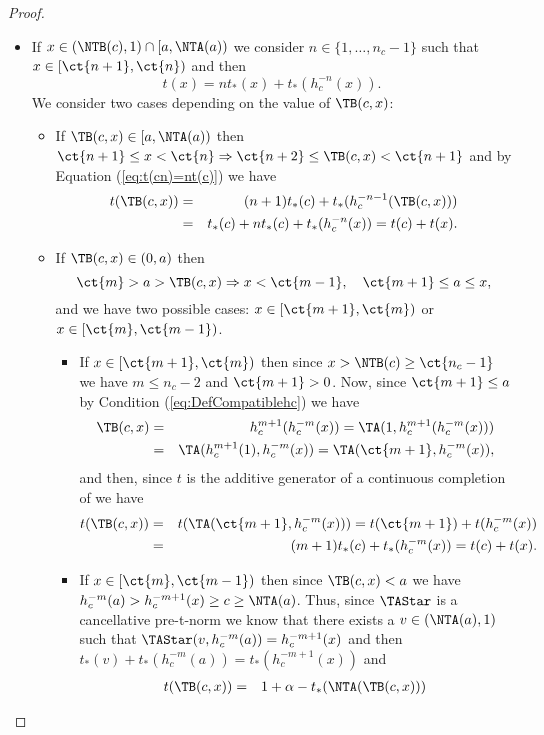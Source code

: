 \begin{proof}
\begin{enumerate}[label=(\roman*)]
\begin{itemize}
\begin{itemize}
				\item If $x \in (\NTB(c),1) \cap [a,\NTA(a))$ we consider $n \in \{1,\dots,n_c-1\}$ such that $x \in [\ct{n+1},\ct{n})$ and then
				$$ t(x) = nt_*(x)+t_*(h_c^{-n}(x)).$$
				We consider two cases depending on the value of $\TB(c,x)$:
				\begin{itemize}
					\item  If $\TB(c,x) \in [a,\NTA(a))$ then $\ct{n+1} \leq x < \ct{n} \Rightarrow \ct{n+2} \leq \TB(c,x) < \ct{n+1}$ and by Equation (\ref{eq:t(cn)=nt(c)}) we have
					\begin{eqnarray*}
					t(\TB(c,x)) & = & (n+1)t_*(c)+t_*(h_c^{-n-1}(\TB(c,x))) \\
					& = & t_*(c) + nt_*(c) + t_*(h_c^{-n}(x)) = t(c)+t(x).
					\end{eqnarray*}
					\item  If $\TB(c,x) \in (0,a)$ then
					$$\ct{m} > a > \TB(c,x) \Rightarrow x < \ct{m-1}, \quad \ct{m+1} \leq a \leq x,$$
					and we have two possible cases: $x \in [\ct{m+1},\ct{m})$ or $x \in [\ct{m},\ct{m-1})$.
					\begin{itemize}
						\item If $x \in [\ct{m+1},\ct{m})$ then since $x > \NTB(c) \geq \ct{n_c-1}$ we have $m \leq n_c-2$ and $\ct{m+1}>0$. Now, since $\ct{m+1} \leq a$ by Condition (\ref{eq:DefCompatiblehc}) we have
						\begin{eqnarray*}
							\TB(c,x) &=& h_c^{m+1}(h_c^{-m}(x)) = \TA(1,h_c^{m+1}(h_c^{-m}(x))) \\
							&=& \TA(h_c^{m+1}(1),h_c^{-m}(x))= \TA(\ct{m+1},h_c^{-m}(x)),
						\end{eqnarray*}
						and then, since $t$ is the additive generator of a continuous completion of \TA we have
						\begin{eqnarray*}
							t(\TB(c,x)) &=& t(\TA(\ct{m+1},h_c^{-m}(x))) = t(\ct{m+1}) + t(h_c^{-m}(x)) \\
							&=& (m+1)t_*(c)+ t_*(h_c^{-m}(x)) = t(c)+t(x).
						\end{eqnarray*}
						\item If $x \in [\ct{m},\ct{m-1})$ then since $\TB(c,x)<a$ we have $h_c^{-m}(a) > h_c^{-m+1}(x) \geq c \geq \NTA(a)$. Thus, since $\TAStar$ is a cancellative pre-t-norm we know that there exists a $v \in (\NTA(a),1)$ such that $\TAStar(v,h_c^{-m}(a)) = h_c^{-m+1}(x)$ and then $t_*(v)+t_*(h_c^{-m}(a))=t_*(h_c^{-m+1}(x))$ and
						\begin{eqnarray*}
							t(\TB(c,x)) & = & 1 + \alpha - t_*(\NTA(\TB(c,x))) \\

\end{eqnarray*}
\end{itemize}
\end{itemize}
\end{itemize}
\end{itemize}
\end{enumerate}
\end{proof}

